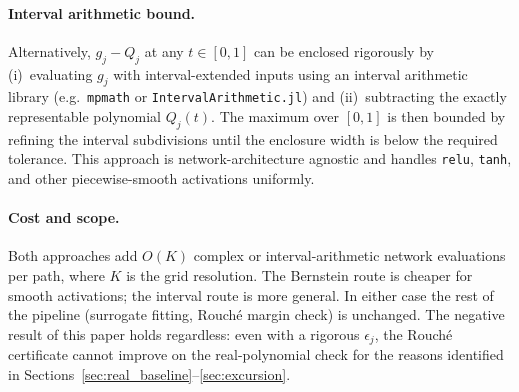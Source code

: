 \documentclass{article}
\theoremstyle{definition}
\begin{document}
\paragraph{Interval arithmetic bound.}
Alternatively, $g_j - Q_j$ at any $t \in [0,1]$ can be enclosed
rigorously by (i)~evaluating $g_j$ with interval-extended inputs
using an interval arithmetic library (e.g.\ \texttt{mpmath} or
\texttt{IntervalArithmetic.jl}) and (ii)~subtracting the exactly
representable polynomial $Q_j(t)$.  The maximum over $[0,1]$ is then
bounded by refining the interval subdivisions until the enclosure width
is below the required tolerance.  This approach is network-architecture
agnostic and handles \texttt{relu}, \texttt{tanh}, and other
piecewise-smooth activations uniformly.

\paragraph{Cost and scope.}
Both approaches add $O(K)$ complex or interval-arithmetic network
evaluations per path, where $K$ is the grid resolution.  The Bernstein
route is cheaper for smooth activations; the interval route is more
general.  In either case the rest of the pipeline (surrogate fitting,
Rouch\'e margin check) is unchanged.  The negative result of this paper
holds regardless: even with a rigorous $\epsilon_j$, the Rouch\'e
certificate cannot improve on the real-polynomial check for the reasons
identified in Sections~\ref{sec:real_baseline}--\ref{sec:excursion}.



\end{document}
